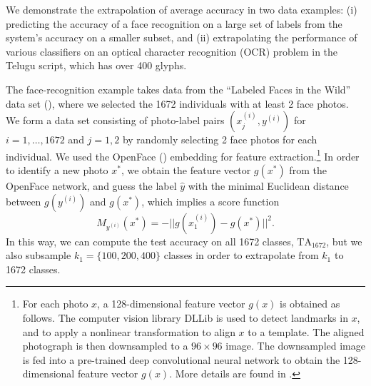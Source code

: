 \documentclass[twoside,11pt]{article}
\begin{document}

We demonstrate the extrapolation of average accuracy in two data examples:
(i) predicting the
accuracy of a face recognition on a large set of labels from the
system's accuracy on a smaller subset, and (ii) extrapolating the performance of various classifiers on an optical character recognition (OCR) problem in the Telugu script, which has over 400 glyphs.

The face-recognition example takes data from the ``Labeled Faces in the Wild'' data set (\cite{LFWTech}), where we selected the 1672 individuals with at least 2 face photos.  We form a
data set consisting of photo-label pairs $(x_j^{(i)}, y^{(i)})$
for $i = 1,\hdots, 1672$ and $j = 1,2$ by randomly selecting 2 face
photos for each individual.
We used the OpenFace (\cite{amos2016openface}) embedding for feature
extraction.\footnote{For each photo $x$, a 128-dimensional feature vector
$g(x)$ is obtained as follows.  The computer vision library DLLib is
used to detect landmarks in $x$, and to apply a nonlinear
transformation to align $x$ to a template.  The aligned photograph is
then downsampled to a $96 \times 96$ image. The downsampled image is
fed into a pre-trained deep convolutional neural network to obtain the
128-dimensional feature vector $g(x)$. More details are found in
\cite{amos2016openface}.}
In order to identify a new photo $x^*$, we obtain the feature
vector $g(x^*)$ from the OpenFace network, and guess the label $\hat{y}$
with the minimal Euclidean distance between $g(y^{(i)})$ and $g(x^*)$,
which implies a score function
\[
M_{y^{(i)}}(x^*) = -||g(x_1^{(i)}) - g(x^*)||^2.
\]
In this way, we can compute the test accuracy on all 1672 classes, $\text{TA}_{1672}$, but we also subsample $k_1 = \{100,200,400\}$ classes in order to extrapolate from $k_1$ to 1672 classes.
\end{document}
